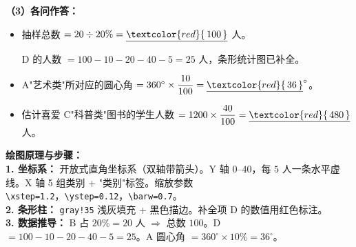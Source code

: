 \documentclass[12pt, a4paper]{ctexrep}
\begin{document}
\begin{center}
\end{center}

\vspace{0.4cm}
\textbf{（3）各问作答：}

\begin{itemize}
    \item[\textbf{(1)}] 抽样总数 $= 20 \div 20\% = \underline{\textcolor{red}{\,100\,}}$ 人。

    D 的人数 $= 100 - 10 - 20 - 40 - 5 = 25$ 人，条形统计图已补全。

    \item[\textbf{(2)}] A"艺术类"所对应的圆心角 $= 360^\circ \times \dfrac{10}{100} = \underline{\textcolor{red}{\,36\,}}^\circ$。

    \item[\textbf{(3)}] 估计喜爱 C"科普类"图书的学生人数 $= 1200 \times \dfrac{40}{100} = \underline{\textcolor{red}{\,480\,}}$ 人。
\end{itemize}

\vspace{0.4cm}
{\small\color{blue!70!black}
\textbf{绘图原理与步骤：}\\
\textbf{1. 坐标系：} 开放式直角坐标系（双轴带箭头）。Y 轴 $0$--$40$，每 $5$ 人一条水平虚线。X 轴 5 组类别 + "类别"标签。缩放参数 \texttt{\textbackslash{}xstep=1.2}，\texttt{\textbackslash{}ystep=0.12}，\texttt{\textbackslash{}barw=0.7}。\\
\textbf{2. 条形柱：} \texttt{gray!35} 浅灰填充 + 黑色描边。补全项 D 的数值用红色标注。\\
\textbf{3. 数据推导：} B 占 $20\% = 20$ 人 $\Rightarrow$ 总数 $100$。D $= 100 - 10 - 20 - 40 - 5 = 25$。A 圆心角 $= 360^\circ \times 10\% = 36^\circ$。
}
\end{document}
